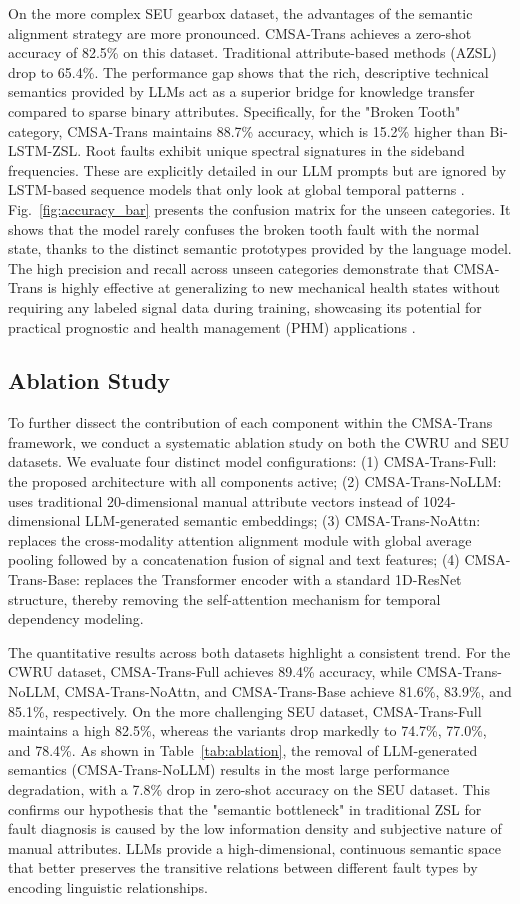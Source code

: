 {On the more complex SEU gearbox dataset, the advantages of the semantic alignment strategy are more pronounced. CMSA-Trans achieves a zero-shot accuracy of 82.5\% on this dataset. Traditional attribute-based methods (AZSL) drop to 65.4\%. The performance gap shows that the rich, descriptive technical semantics provided by LLMs act as a superior bridge for knowledge transfer compared to sparse binary attributes. Specifically, for the "Broken Tooth" category, CMSA-Trans maintains 88.7\% accuracy, which is 15.2\% higher than Bi-LSTM-ZSL. Root faults exhibit unique spectral signatures in the sideband frequencies. These are explicitly detailed in our LLM prompts but are ignored by LSTM-based sequence models that only look at global temporal patterns \cite{zhang2021attention}. Fig.~\ref{fig:accuracy_bar} presents the confusion matrix for the unseen categories. It shows that the model rarely confuses the broken tooth fault with the normal state, thanks to the distinct semantic prototypes provided by the language model. The high precision and recall across unseen categories demonstrate that CMSA-Trans is highly effective at generalizing to new mechanical health states without requiring any labeled signal data during training, showcasing its potential for practical prognostic and health management (PHM) applications \cite{jia2016deep}.

\subsection{Ablation Study}
To further dissect the contribution of each component within the CMSA-Trans framework, we conduct a systematic ablation study on both the CWRU and SEU datasets. We evaluate four distinct model configurations: (1) CMSA-Trans-Full: the proposed architecture with all components active; (2) CMSA-Trans-NoLLM: uses traditional 20-dimensional manual attribute vectors instead of 1024-dimensional LLM-generated semantic embeddings; (3) CMSA-Trans-NoAttn: replaces the cross-modality attention alignment module with global average pooling followed by a concatenation fusion of signal and text features; (4) CMSA-Trans-Base: replaces the Transformer encoder with a standard 1D-ResNet structure, thereby removing the self-attention mechanism for temporal dependency modeling.

The quantitative results across both datasets highlight a consistent trend. For the CWRU dataset, CMSA-Trans-Full achieves 89.4\% accuracy, while CMSA-Trans-NoLLM, CMSA-Trans-NoAttn, and CMSA-Trans-Base achieve 81.6\%, 83.9\%, and 85.1\%, respectively. On the more challenging SEU dataset, CMSA-Trans-Full maintains a high 82.5\%, whereas the variants drop markedly to 74.7\%, 77.0\%, and 78.4\%. As shown in Table~\ref{tab:ablation}, the removal of LLM-generated semantics (CMSA-Trans-NoLLM) results in the most large performance degradation, with a 7.8\% drop in zero-shot accuracy on the SEU dataset. This confirms our hypothesis that the "semantic bottleneck" in traditional ZSL for fault diagnosis is caused by the low information density and subjective nature of manual attributes. LLMs provide a high-dimensional, continuous semantic space that better preserves the transitive relations between different fault types by encoding linguistic relationships.

}
